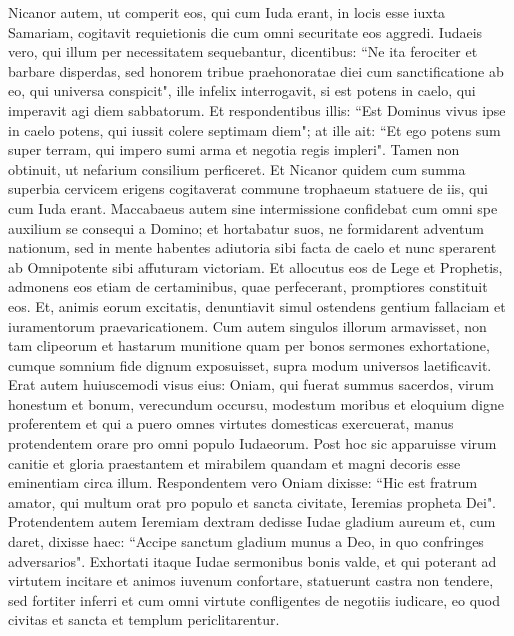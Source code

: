 \begin{biblechapter}  
\verse Nicanor autem, ut comperit eos, qui cum Iuda erant, in locis esse iuxta Samariam, cogitavit requietionis die cum omni securitate eos aggredi. 
\verse Iudaeis vero, qui illum per necessitatem sequebantur, dicentibus: “Ne ita ferociter et barbare disperdas, sed honorem tribue praehonoratae diei cum sanctificatione ab eo, qui universa conspicit", 
\verse ille infelix interrogavit, si est potens in caelo, qui imperavit agi diem sabbatorum. 
\verse Et respondentibus illis: “Est Dominus vivus ipse in caelo potens, qui iussit colere septimam diem"; 
\verse at ille ait: “Et ego potens sum super terram, qui impero sumi arma et negotia regis impleri". Tamen non obtinuit, ut nefarium consilium perficeret. 
\verse Et Nicanor quidem cum summa superbia cervicem erigens cogitaverat commune trophaeum statuere de iis, qui cum Iuda erant. 
\verse Maccabaeus autem sine intermissione confidebat cum omni spe auxilium se consequi a Domino; 
\verse et hortabatur suos, ne formidarent adventum nationum, sed in mente habentes adiutoria sibi facta de caelo et nunc sperarent ab Omnipotente sibi affuturam victoriam. 
\verse Et allocutus eos de Lege et Prophetis, admonens eos etiam de certaminibus, quae perfecerant, promptiores constituit eos. 
\verse Et, animis eorum excitatis, denuntiavit simul ostendens gentium fallaciam et iuramentorum praevaricationem. 
\verse Cum autem singulos illorum armavisset, non tam clipeorum et hastarum munitione quam per bonos sermones exhortatione, cumque somnium fide dignum exposuisset, supra modum universos laetificavit. 
\verse Erat autem huiuscemodi visus eius: Oniam, qui fuerat summus sacerdos, virum honestum et bonum, verecundum occursu, modestum moribus et eloquium digne proferentem et qui a puero omnes virtutes domesticas exercuerat, manus protendentem orare pro omni populo Iudaeorum. 
\verse Post hoc sic apparuisse virum canitie et gloria praestantem et mirabilem quandam et magni decoris esse eminentiam circa illum. 
\verse Respondentem vero Oniam dixisse: “Hic est fratrum amator, qui multum orat pro populo et sancta civitate, Ieremias propheta Dei". 
\verse Protendentem autem Ieremiam dextram dedisse Iudae gladium aureum et, cum daret, dixisse haec: 
\verse “Accipe sanctum gladium munus a Deo, in quo confringes adversarios". 
\verse Exhortati itaque Iudae sermonibus bonis valde, et qui poterant ad virtutem incitare et animos iuvenum confortare, statuerunt castra non tendere, sed fortiter inferri et cum omni virtute confligentes de negotiis iudicare, eo quod civitas et sancta et templum periclitarentur. 

\end{biblechapter}
